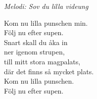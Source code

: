 {\footnotesize\textit{Melodi: Sov du lilla videung}}\par
\vspace{10pt}
Kom nu lilla punschen min.\\
Följ nu efter supen. \\
Snart skall du åka in\\
ner igenom strupen,\\
till mitt stora magpalats,\\
där det finns så mycket plats.\\
Kom nu lilla punschen.\\
Följ nu efter supen.
